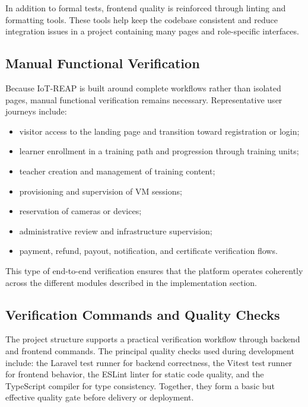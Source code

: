 In addition to formal tests, frontend quality is reinforced through linting and formatting tools. These tools help keep the codebase consistent and reduce integration issues in a project containing many pages and role-specific interfaces.

\subsection{Manual Functional Verification}

Because IoT-REAP is built around complete workflows rather than isolated pages, manual functional verification remains necessary. Representative user journeys include:
\begin{itemize}
    \item visitor access to the landing page and transition toward registration or login;
    \item learner enrollment in a training path and progression through training units;
    \item teacher creation and management of training content;
    \item provisioning and supervision of VM sessions;
    \item reservation of cameras or devices;
    \item administrative review and infrastructure supervision;
    \item payment, refund, payout, notification, and certificate verification flows.
\end{itemize}

This type of end-to-end verification ensures that the platform operates coherently across the different modules described in the implementation section.

\subsection{Verification Commands and Quality Checks}
The project structure supports a practical verification workflow through backend and frontend commands. The principal quality checks used during development include: the Laravel test runner for backend correctness, the Vitest test runner for frontend behavior, the ESLint linter for static code quality, and the TypeScript compiler for type consistency. Together, they form a basic but effective quality gate before delivery or deployment.
